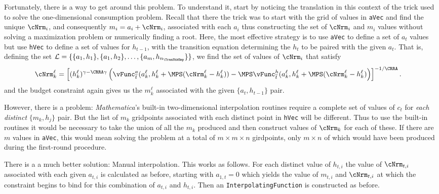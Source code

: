 \documentclass[titlepage, headings=optiontotocandhead]{\econtex}
\newcommand{\Mma}{\textit{Mathematica}}
\begin{document}
{  Fortunately, there is a way to get around this problem.  To
  understand it, start by noticing the translation in this context of
  the trick used to solve the one-dimensional consumption problem.
  Recall that there the trick was to start with the grid of values in
  \texttt{aVec} and find the unique ${\cNrm}_{i}$, and
  consequently ${m}_{i}={a}_{i}+{\cNrm}_{i}$, associated with
  each ${a}_{i}$ thus constructing the set of ${\cNrm}_{i}$ and
  ${m}_{i}$ values without solving a maximization problem or
  numerically finding a root.  Here, the most effective strategy is to
  use \texttt{aVec} to define a set of ${a}_{t}$ values but use
  \texttt{hVec} to define a set of values for $h_{t-1}$, with the
  transition equation determining the $h_{t}$ to be paired with the
  given ${a}_{t}$.  That is, defining the set $\mathcal{L} =
  \{\{{a}_{1},h_{1}\},\{{a}_{1},h_{2}\},\ldots,\{{a}_{m},h_{n_{\TranShkEmp}}\}\}$,
  we find the set of values of ${\cNrm}_{i}$ that satisfy
  \begin{equation}\begin{gathered}\begin{aligned}
        {\cNrm}_{k}^{\ell}  & = \left[(h_{k}^{\ell})^{\gamma-\CRRA\gamma}
          \left(\vEOPt^{{a}}({a}_{k}^{\ell},h_{k}^{\ell}
            +\MPS({\cNrm}_{k}^{\ell}-h_{k}^{\ell}))
            -\MPS
            \vEOPt^{h}({a}_{k}^{\ell},h_{k}^{\ell}+\MPS({\cNrm}_{k}^{\ell}-h_{k}^{\ell})\right)
        \right]^{-1/\CRRA}. \nonumber
      \end{aligned}\end{gathered}\end{equation}
  and the budget constraint again gives us the ${m}_{k}^{\ell}$
  associated with the given $\{{a}_{t},h_{t-1}\}$ pair.

  However, there is a problem: {\Mma}'s built-in two-dimensional
  interpolation routines require a complete set of values of ${c}_{t}$
  for \textit{each distinct} $\{{m}_{k},h_{j}\}$ pair.  But the list of
  ${m}_{k}$ gridpoints associated with each distinct point in
  \texttt{hVec} will be different.  Thus to use the built-in routines
  it would be necessary to take the union of all the ${m}_{k}$
  produced and then construct values of ${\cNrm}_{k}$ for each of
  these.  If there are $m$ values in \texttt{aVec}, this would
  mean solving the problem at a total of $m \times m \times n$
  girdpoints, only $m \times n$ of which would have been produced
  during the first-round procedure.

  There is a a much better solution: Manual interpolation.  This works
  as follows.  For each distinct value of $h_{t,i}$ the value of
  ${\cNrm}_{t,i}$ associated with each given ${a}_{t,i}$ is
  calculated as before, starting with ${a}_{1,t}=0$ which yields
  the value of ${m}_{t,i}$ and ${\cNrm}_{t,i}$ at which the
  constraint begins to bind for this combination of ${a}_{t,i}$
  and $h_{t,i}$.  Then an \texttt{InterpolatingFunction} is
  constructed as before.

}
\end{document}
